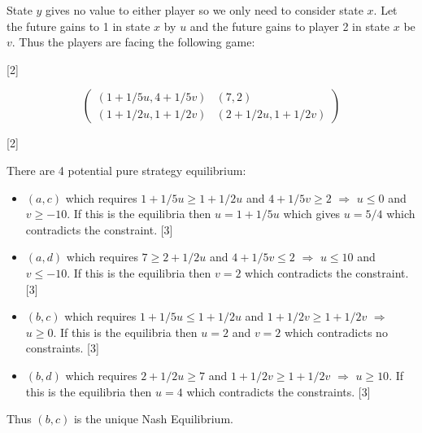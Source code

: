 \documentclass[12pt,a4paper]{article}
\makeatletter
\renewcommand{\@oddfoot}{\hfil \arabic{page} \hfil}    %
\makeatother
\begin{document}
\begin{enumerate}
\begin{enumerate}
        State \(y\) gives no value to either player so we only need to consider state \(x\). Let the future gains to 1 in state \(x\) by \(u\) and the future gains to player 2 in state \(x\) be \(v\). Thus the players are facing the following game:

        \hfill[2]

        \[\begin{pmatrix}
        (1+1/5u,4+1/5v)&(7,2)\\
        (1+1/2u,1+1/2v)&(2+1/2u,1+1/2v)
        \end{pmatrix}\]

        \hfill[2]

        There are 4 potential pure strategy equilibrium:

        \begin{itemize}
            \item \((a,c)\) which requires \(1+1/5u\geq1+1/2u\) and \(4+1/5v\geq2\) \(\Rightarrow\) \(u\leq 0\) and \(v\geq -10\). If this is the equilibria then \(u=1+1/5u\) which gives \(u=5/4\) which contradicts the constraint.
            \hfill[3]
            \item \((a,d)\) which requires \(7\geq2+1/2u\) and \(4+1/5v\leq2\) \(\Rightarrow\) \(u\leq 10\) and \(v\leq -10\). If this is the equilibria then \(v=2\) which contradicts the constraint.
            \hfill[3]
            \item \((b,c)\) which requires \(1+1/5u\leq1+1/2u\) and \(1+1/2v\geq1+1/2v\) \(\Rightarrow\) \(u\geq 0\). If this is the equilibria then \(u=2\) and \(v=2\) which contradicts no constraints.
            \hfill[3]
            \item \((b,d)\) which requires \(2+1/2u\geq 7\) and \(1+1/2v\geq1+1/2v\) \(\Rightarrow\) \(u\geq 10\). If this is the equilibria then \(u=4\) which contradicts the constraints.
            \hfill[3]
        \end{itemize}

        Thus \((b,c)\) is the unique Nash Equilibrium.


    \end{enumerate}
\end{enumerate}


\makeatletter
\renewcommand{\@oddfoot}{\hfil \arabic{page}X \hfil}    %
\makeatother
\end{document}
